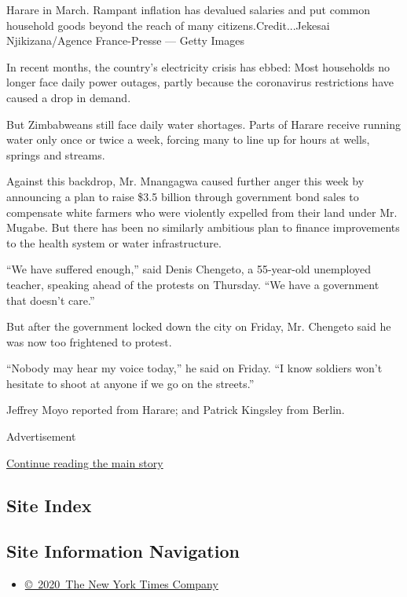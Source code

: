 Harare in March. Rampant inflation has devalued salaries and put common
household goods beyond the reach of many citizens.Credit...Jekesai
Njikizana/Agence France-Presse --- Getty Images

In recent months, the country's electricity crisis has ebbed: Most
households no longer face daily power outages, partly because the
coronavirus restrictions have caused a drop in demand.

But Zimbabweans still face daily water shortages. Parts of Harare
receive running water only once or twice a week, forcing many to line up
for hours at wells, springs and streams.

Against this backdrop, Mr. Mnangagwa caused further anger this week by
announcing a plan to raise \$3.5 billion through government bond sales
to compensate white farmers who were violently expelled from their land
under Mr. Mugabe. But there has been no similarly ambitious plan to
finance improvements to the health system or water infrastructure.

``We have suffered enough,'' said Denis Chengeto, a 55-year-old
unemployed teacher, speaking ahead of the protests on Thursday. ``We
have a government that doesn't care.''

But after the government locked down the city on Friday, Mr. Chengeto
said he was now too frightened to protest.

``Nobody may hear my voice today,'' he said on Friday. ``I know soldiers
won't hesitate to shoot at anyone if we go on the streets.''

Jeffrey Moyo reported from Harare; and Patrick Kingsley from Berlin.

Advertisement

\protect\hyperlink{after-bottom}{Continue reading the main story}

\hypertarget{site-index}{%
\subsection{Site Index}\label{site-index}}

\hypertarget{site-information-navigation}{%
\subsection{Site Information
Navigation}\label{site-information-navigation}}

\begin{itemize}
\tightlist
\item
  \href{https://help.nytimes.com/hc/en-us/articles/115014792127-Copyright-notice}{©~2020~The
  New York Times Company}
\end{itemize}

